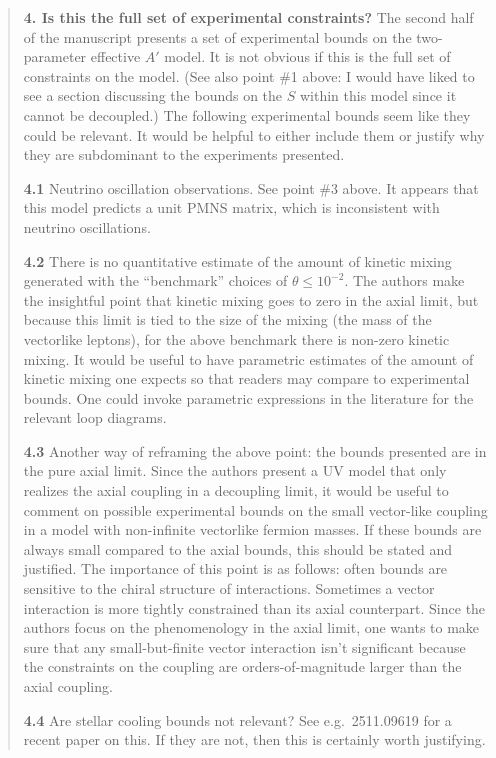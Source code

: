 \documentclass[
  chinese,
  UTF8]{ctexart}
\begin{document}
\begin{quote}
\textbf{4. Is this the full set of experimental constraints?} The second
half of the manuscript presents a set of experimental bounds on the
two-parameter effective \(A'\) model. It is not obvious if this is the
full set of constraints on the model. (See also point \#1 above: I would
have liked to see a section discussing the bounds on the \(S\) within
this model since it cannot be decoupled.) The following experimental
bounds seem like they could be relevant. It would be helpful to either
include them or justify why they are subdominant to the experiments
presented.

\textbf{4.1} Neutrino oscillation observations. See point \#3 above. It
appears that this model predicts a unit PMNS matrix, which is
inconsistent with neutrino oscillations.

\textbf{4.2} There is no quantitative estimate of the amount of kinetic
mixing generated with the ``benchmark'' choices of
\(\theta\leq10^{-2}\). The authors make the insightful point that
kinetic mixing goes to zero in the axial limit, but because this limit
is tied to the size of the mixing (the mass of the vectorlike leptons),
for the above benchmark there is non-zero kinetic mixing. It would be
useful to have parametric estimates of the amount of kinetic mixing one
expects so that readers may compare to experimental bounds. One could
invoke parametric expressions in the literature for the relevant loop
diagrams.

\textbf{4.3} Another way of reframing the above point: the bounds
presented are in the pure axial limit. Since the authors present a UV
model that only realizes the axial coupling in a decoupling limit, it
would be useful to comment on possible experimental bounds on the small
vector-like coupling in a model with non-infinite vectorlike fermion
masses. If these bounds are always small compared to the axial bounds,
this should be stated and justified. The importance of this point is as
follows: often bounds are sensitive to the chiral structure of
interactions. Sometimes a vector interaction is more tightly constrained
than its axial counterpart. Since the authors focus on the phenomenology
in the axial limit, one wants to make sure that any small-but-finite
vector interaction isn't significant because the constraints on the
coupling are orders-of-magnitude larger than the axial coupling.

\textbf{4.4} Are stellar cooling bounds not relevant? See
e.g.~2511.09619 for a recent paper on this. If they are not, then this
is certainly worth justifying.
\end{quote}
\end{document}
